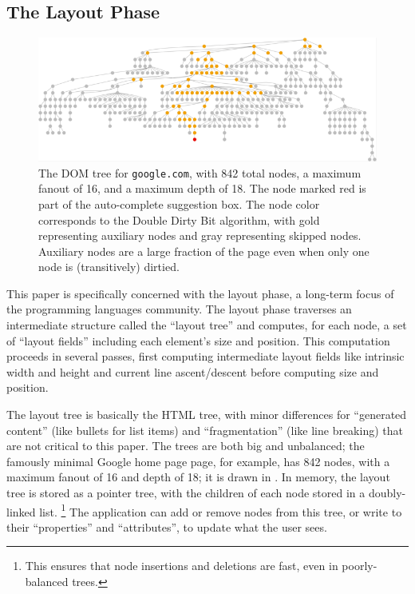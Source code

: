 \subsection{The Layout Phase}
\begin{figure}
\includegraphics[scale=0.3]{tree.png}
\caption{The DOM tree for \texttt{google.com}, with 842 total nodes, a maximum fanout of 16, and a maximum depth of 18. The node marked red is part of the auto-complete suggestion box. The node color corresponds to the Double Dirty Bit algorithm, with gold representing auxiliary nodes and gray representing skipped nodes. Auxiliary nodes are a large fraction of the page even when only one node is (transitively) dirtied.
}
\label{fig:google}
\end{figure}

This paper is specifically concerned with the layout phase,
  a long-term focus of the programming languages community.
The layout phase traverses an intermediate structure
  called the ``layout tree'' and computes, for each node,
  a set of ``layout fields''
  including each element's size and position.
This computation proceeds in several passes,
  first computing intermediate layout fields
  like intrinsic width and height
  and current line ascent/descent
  before computing size and position.

The layout tree is basically the HTML tree,
  with minor differences for
  ``generated content'' (like bullets for list items)
  and ``fragmentation'' (like line breaking)
  that are not critical to this paper.
The trees are both big and unbalanced;
  the famously minimal Google home page page, for example,
  has 842 nodes, with a maximum fanout of 16 and depth of 18;
  it is drawn in .
In memory, the layout tree is stored as a pointer tree,
  with the children of each node stored in a doubly-linked list.%
\footnote{
This ensures that node insertions and deletions are fast,
  even in poorly-balanced trees.
}
The application can add or remove nodes from this tree,
  or write to their ``properties'' and ``attributes'',
  to update what the user sees.

